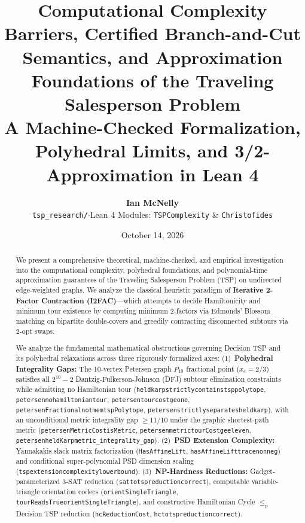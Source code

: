 \documentclass[11pt,a4paper]{article}
\title{\textbf{Computational Complexity Barriers, Certified Branch-and-Cut Semantics, and Approximation Foundations of the Traveling Salesperson Problem}\\
\large A Machine-Checked Formalization, Polyhedral Limits, and 3/2-Approximation in Lean 4}
\author{
  \textbf{Ian McNelly} \\
  \texttt{tsp\_research/}\quad $\cdot$\quad Lean 4 Modules: \texttt{TSPComplexity} \& \texttt{Christofides}
}
\date{October 14, 2026}
\renewcommand{\_}{\origunderscore\allowbreak}
\theoremstyle{plain}
\theoremstyle{definition}
\theoremstyle{remark}
\begin{document}
\maketitle

\begin{abstract}
We present a comprehensive theoretical, machine-checked, and empirical investigation into the computational complexity, polyhedral foundations, and polynomial-time approximation guarantees of the Traveling Salesperson Problem (TSP) on undirected edge-weighted graphs. We analyze the classical heuristic paradigm of \textbf{Iterative 2-Factor Contraction (I2FAC)}---which attempts to decide Hamiltonicity and minimum tour existence by computing minimum 2-factors via Edmonds' Blossom matching on bipartite double-covers and greedily contracting disconnected subtours via 2-opt swaps.

We analyze the fundamental mathematical obstructions governing Decision TSP and its polyhedral relaxations across three rigorously formalized axes:
(1)~\textbf{Polyhedral Integrality Gaps:} The 10-vertex Petersen graph $P_{10}$ fractional point ($x_e = 2/3$) satisfies all $2^{10}-2$ Dantzig-Fulkerson-Johnson (DFJ) subtour elimination constraints while admitting no Hamiltonian tour (\texttt{held\_karp\_strictly\_contains\_tsp\_polytope}, \texttt{petersen\_no\_hamiltonian\_tour}, \texttt{petersen\_tour\_cost\_ge\_one}, \texttt{petersenFractional\_not\_mem\_tspPolytope}, \texttt{petersen\_strictly\_separates\_held\_karp}), with an unconditional metric integrality gap $\ge 11/10$ under the graphic shortest-path metric (\texttt{petersenMetricCost\_isMetric}, \texttt{petersen\_metric\_tourCost\_ge\_eleven}, \texttt{petersen\_heldKarp\_metric_integrality_gap}).
(2)~\textbf{PSD Extension Complexity:} Yannakakis slack matrix factorization (\texttt{HasAffineLift}, \texttt{hasAffineLift\_trace\_nonneg}) and conditional super-polynomial PSD dimension scaling (\texttt{tsp\_extension\_complexity\_lower\_bound}).
(3)~\textbf{NP-Hardness Reductions:} Gadget-parameterized 3-SAT reduction (\texttt{sat\_to\_tsp\_reduction\_correct}), computable variable-triangle orientation codecs (\texttt{orient\allowbreak Single\allowbreak Triangle}, \texttt{tourReadsTrue\_orientSingleTriangle}), and constructive Hamiltonian Cycle $\le_p$ Decision TSP reduction (\texttt{hcReductionCost}, \texttt{hc\_to\_tsp\_reduction\_correct}).


\end{abstract}
\end{document}
